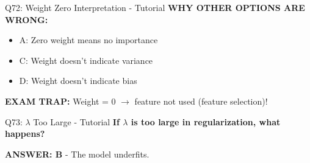 \documentclass[8pt]{beamer}
\begin{document}
\begin{frame}{Q72: Weight Zero Interpretation - Tutorial}
		\vspace{0.05cm}
		\textcolor{myred}{\textbf{WHY OTHER OPTIONS ARE WRONG:}}
		\begin{itemize}
			\item \textcolor{myred}{A:} Zero weight means no importance
			\item \textcolor{myred}{C:} Weight doesn't indicate variance
			\item \textcolor{myred}{D:} Weight doesn't indicate bias
		\end{itemize}
		
		\textcolor{myred}{\textbf{EXAM TRAP:}} Weight = 0 $\to$ feature not used (feature selection)!
	\end{frame}
	
	\begin{frame}{Q73: $\lambda$ Too Large - Tutorial}
		\fontsize{6.5}{7.5}\selectfont
		\textbf{If $\lambda$ is too large in regularization, what happens?}
		
		\vspace{0.05cm}
		\textcolor{myblue}{\textbf{ANSWER: B}} - The model underfits.
		

\end{frame}
\end{document}
